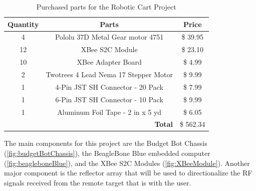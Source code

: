 \begin{table}[h!]
  \centering
  \begin{tabular}{c|c|c}
    \toprule
    \textbf{Quantity} & \textbf{Parts} & \textbf{Price}\\
    \toprule
    4 & Pololu 37D Metal Gear motor 4751 & \$ 39.95\\
    12 & XBee S2C Module & \$ 23.10\\
    10 & XBee Adapter Board & \$ 4.99\\
    2 & Twotrees 4 Lead Nema 17 Stepper Motor & \$ 9.99\\
    1 & 4-Pin JST SH Connector - 20 Pack & \$ 7.99\\
    1 & 6-Pin JST SH Connector - 10 Pack & \$ 9.99\\
    1 & Aluminum Foil Tape - 2 in x 5 yd & \$ 6.05\\
    \bottomrule
    \multicolumn{2}{r|}{\textbf{Total}} & \$ 562.34\\
    \bottomrule
  \end{tabular}
  \caption{Purchased parts for the Robotic Cart Project}
  \label{tab:Partslist}
\end{table}

\vspace*{12pt}
\noindent
The main components for this project are the Budget Bot Chassis (\autoref{fig:budgetBotChassis}), the BeagleBone Blue embedded computer (\autoref{fig:beagleboneBlue}), and the XBee S2C Modules (\autoref{fig:XBeeModule}). Another major component is the reflector array that
will be used to directionalize the RF signals received from the remote target that is with the user.

